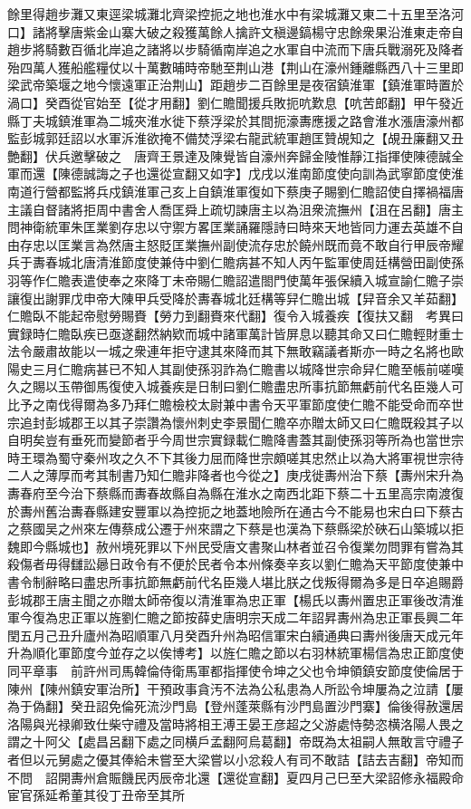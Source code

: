 餘里得趙步灘又東逕梁城灘北齊梁控扼之地也淮水中有梁城灘又東二十五里至洛河口】諸將擊唐紫金山寨大破之殺獲萬餘人擒許文稹邊鎬楊守忠餘衆果沿淮東走帝自趙步將騎數百循北岸追之諸將以步騎循南岸追之水軍自中流而下唐兵戰溺死及降者殆四萬人獲船艦糧仗以十萬數晡時帝馳至荆山港【荆山在濠州鍾離縣西八十三里即梁武帝築堰之地今懷遠軍正治荆山】距趙步二百餘里是夜宿鎮淮軍【鎮淮軍時置於渦口】癸酉從官始至【從才用翻】劉仁贍聞援兵敗扼吭歎息【吭苦郎翻】甲午發近縣丁夫城鎮淮軍為二城夾淮水徙下蔡浮梁於其間扼濠夀應援之路會淮水漲唐濠州都監彭城郭廷詔以水軍泝淮欲掩不備焚浮梁右龍武統軍趙匡贊覘知之【覘丑廉翻又丑艶翻】伏兵邀擊破之　唐齊王景達及陳覺皆自濠州奔歸金陵惟靜江指揮使陳德誠全軍而還【陳德誠誨之子也還從宣翻又如字】戊戌以淮南節度使向訓為武寧節度使淮南道行營都監將兵戍鎮淮軍己亥上自鎮淮軍復如下蔡庚子賜劉仁贍詔使自擇禍福唐主議自督諸將拒周中書舍人喬匡舜上疏切諫唐主以為沮衆流撫州【沮在呂翻】唐主問神衛統軍朱匡業劉存忠以守禦方畧匡業誦羅隱詩曰時來天地皆同力運去英雄不自由存忠以匡業言為然唐主怒貶匡業撫州副使流存忠於饒州既而竟不敢自行甲辰帝耀兵于夀春城北唐清淮節度使兼侍中劉仁贍病甚不知人丙午監軍使周廷構營田副使孫羽等作仁贍表遣使奉之來降丁未帝賜仁贍詔遣閤門使萬年張保續入城宣諭仁贍子崇讓復出謝罪戊申帝大陳甲兵受降於夀春城北廷構等舁仁贍出城【舁音余又羊茹翻】仁贍臥不能起帝慰勞賜賚【勞力到翻賚來代翻】復令入城養疾【復扶又翻　考異曰實録時仁贍臥疾已亟遂翻然納欵而城中諸軍萬計皆屏息以聽其命又曰仁贍輕財重士法令嚴肅故能以一城之衆連年拒守逮其來降而其下無敢竊議者斯亦一時之名將也歐陽史三月仁贍病甚已不知人其副使孫羽詐為仁贍書以城降世宗命舁仁贍至帳前嗟嘆久之賜以玉帶御馬復使入城養疾是日制曰劉仁贍盡忠所事抗節無虧前代名臣幾人可比予之南伐得爾為多乃拜仁贍檢校太尉兼中書令天平軍節度使仁贍不能受命而卒世宗追封彭城郡王以其子崇讚為懷州刺史李景聞仁贍卒亦贈太師又曰仁贍既殺其子以自明矣豈有垂死而變節者乎今周世宗實録載仁贍降書蓋其副使孫羽等所為也當世宗時王環為蜀守秦州攻之久不下其後力屈而降世宗頗嗟其忠然止以為大將軍視世宗待二人之薄厚而考其制書乃知仁贍非降者也今從之】庚戌徙夀州治下蔡【夀州宋升為夀春府至今治下蔡縣而夀春故縣自為縣在淮水之南西北距下蔡二十五里高宗南渡復於夀州舊治夀春縣建安豐軍以為控扼之地蓋地險所在通古今不能易也宋白曰下蔡古之蔡國吴之州來左傳蔡成公遷于州來謂之下蔡是也漢為下蔡縣梁於硤石山築城以拒魏即今縣城也】赦州境死罪以下州民受唐文書聚山林者並召令復業勿問罪有嘗為其殺傷者毋得讎訟曏日政令有不便於民者令本州條奏辛亥以劉仁贍為天平節度使兼中書令制辭略曰盡忠所事抗節無虧前代名臣幾人堪比朕之伐叛得爾為多是日卒追賜爵彭城郡王唐主聞之亦贈太師帝復以清淮軍為忠正軍【楊氏以夀州置忠正軍後改清淮軍今復為忠正軍以旌劉仁贍之節按薛史唐明宗天成二年詔昇夀州為忠正軍長興二年閏五月己丑升廬州為昭順軍八月癸酉升州為昭信軍宋白續通典曰夀州後唐天成元年升為順化軍節度今並存之以俟博考】以旌仁贍之節以右羽林統軍楊信為忠正節度使同平章事　前許州司馬韓倫侍衛馬軍都指揮使令坤之父也令坤領鎮安節度使倫居于陳州【陳州鎮安軍治所】干預政事貪汚不法為公私患為人所訟令坤屢為之泣請【屢為于偽翻】癸丑詔免倫死流沙門島【登州蓬萊縣有沙門島置沙門寨】倫後得赦還居洛陽與光禄卿致仕柴守禮及當時將相王溥王晏王彦超之父游處恃勢恣横洛陽人畏之謂之十阿父【處昌呂翻下處之同横戶孟翻阿烏葛翻】帝既為太祖嗣人無敢言守禮子者但以元舅處之優其俸給未嘗至大梁嘗以小忿殺人有司不敢詰【詰去吉翻】帝知而不問　詔開夀州倉賑饑民丙辰帝北還【還從宣翻】夏四月己巳至大梁詔修永福殿命宦官孫延希董其役丁丑帝至其所

